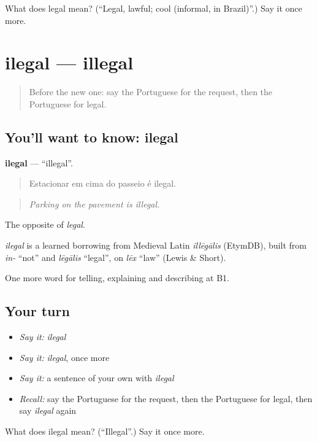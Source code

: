 \begin{tcolorbox}[breakable,colback=teal!4,colframe=teal!35!black,title={Before you move on}]
What does legal mean? (\textquotedblleft{}Legal, lawful; cool (informal, in Brazil)\textquotedblright{}.) Say it once more.
\end{tcolorbox}
\section[ilegal]{ilegal — illegal}

\label{lesson:PT-C385-ilegal}



\begin{quote}
Before the new one: say the Portuguese for the request, then the Portuguese for legal.
\end{quote}

\subsection*{You'll want to know: ilegal}
\textbf{ilegal} — \textquotedblleft{}illegal\textquotedblright{}.

\begin{quote}
Estacionar em cima do passeio é ilegal.
\end{quote}

\begin{quote}
\emph{Parking on the pavement is illegal.}
\end{quote}

The opposite of \emph{legal}.

\begin{cousinweb}
\emph{ilegal} is a learned borrowing from Medieval Latin \emph{illēgālis} (EtymDB), built from \emph{in-} \textquotedblleft{}not\textquotedblright{} and \emph{lēgālis} \textquotedblleft{}legal\textquotedblright{}, on \emph{lēx} \textquotedblleft{}law\textquotedblright{} (Lewis \& Short).
\end{cousinweb}

\begin{grammarlens}[title={What you've built}]
One more word for telling, explaining and describing at B1.
\end{grammarlens}

\subsection*{Your turn}
\begin{itemize}
\raggedright
  \item \emph{Say it:} \emph{ilegal}
  \item \emph{Say it:} \emph{ilegal}, once more
  \item \emph{Say it:} a sentence of your own with \emph{ilegal}
  \item \emph{Recall:} say the Portuguese for the request, then the Portuguese for legal, then say \emph{ilegal} again
\end{itemize}

\begin{tcolorbox}[breakable,colback=teal!4,colframe=teal!35!black,title={Before you move on}]
What does ilegal mean? (\textquotedblleft{}Illegal\textquotedblright{}.) Say it once more.
\end{tcolorbox}
